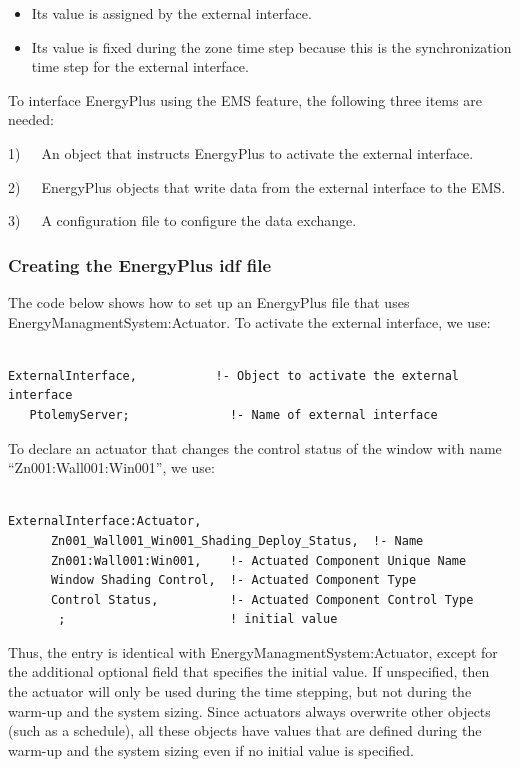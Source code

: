 \begin{itemize}
\item
  Its value is assigned by the external interface.
\item
  Its value is fixed during the zone time step because this is the synchronization time step for the external interface.
\end{itemize}

To interface EnergyPlus using the EMS feature, the following three items are needed:

1)~~~An object that instructs EnergyPlus to activate the external interface.

2)~~~EnergyPlus objects that write data from the external interface to the EMS.

3)~~~A configuration file to configure the data exchange.

\subsubsection{Creating the EnergyPlus idf file}\label{creating-the-energyplus-idf-file-1}

The code below shows how to set up an EnergyPlus file that uses EnergyManagmentSystem:Actuator. To activate the external interface, we use:

\begin{lstlisting}

ExternalInterface,           !- Object to activate the external interface
   PtolemyServer;              !- Name of external interface
\end{lstlisting}

To declare an actuator that changes the control status of the window with name ``Zn001:Wall001:Win001'', we use:

\begin{lstlisting}

ExternalInterface:Actuator,
      Zn001_Wall001_Win001_Shading_Deploy_Status,  !- Name
      Zn001:Wall001:Win001,    !- Actuated Component Unique Name
      Window Shading Control,  !- Actuated Component Type
      Control Status,          !- Actuated Component Control Type
       ;                       ! initial value
\end{lstlisting}

Thus, the entry is identical with EnergyManagmentSystem:Actuator, except for the additional optional field that specifies the initial value. If unspecified, then the actuator will only be used during the time stepping, but not during the warm-up and the system sizing. Since actuators always overwrite other objects (such as a schedule), all these objects have values that are defined during the warm-up and the system sizing even if no initial value is specified.

